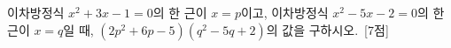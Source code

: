 이차방정식 $x^2+3x-1=0$의 한 근이 $x=p$이고, 이차방정식 $x^2-5x-2=0$의 한 근이 $x=q$일 때, $(2p^2+6p-5)(q^2-5q+2)$의 값을 구하시오.~\mbox{\mbox{[7점]}}
